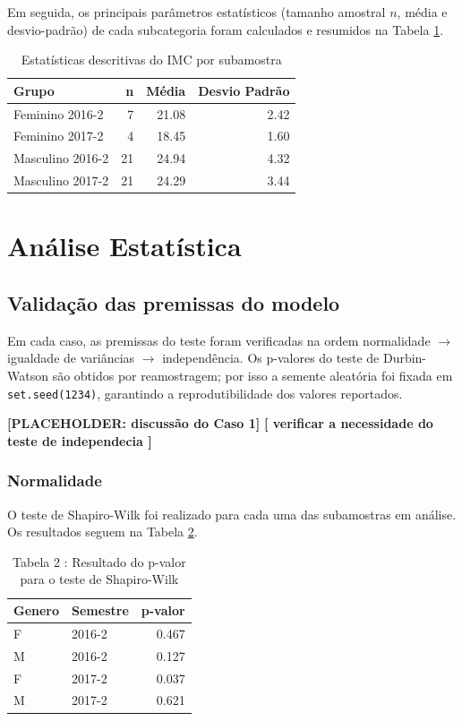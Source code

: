\documentclass[
]{article}
\begin{document}
Em seguida, os principais parâmetros estatísticos (tamanho amostral \(n\), média e desvio-padrão) de cada subcategoria foram calculados e resumidos na Tabela \ref{tab:tabela-resumo}.

\begin{table}[H]
\centering
\caption{\label{tab:tabela-resumo}Estatísticas descritivas do IMC por subamostra}
\centering
\begin{tabular}[t]{l|r|r|r}
\hline
Grupo & n & Média & Desvio Padrão\\
\hline
Feminino 2016-2 & 7 & 21.08 & 2.42\\
\hline
Feminino 2017-2 & 4 & 18.45 & 1.60\\
\hline
Masculino 2016-2 & 21 & 24.94 & 4.32\\
\hline
Masculino 2017-2 & 21 & 24.29 & 3.44\\
\hline
\end{tabular}
\end{table}

\section{Análise Estatística}\label{anuxe1lise-estatuxedstica}

\subsection{Validação das premissas do modelo}\label{validauxe7uxe3o-das-premissas-do-modelo}

Em cada caso, as premissas do teste foram verificadas na ordem
normalidade \(\rightarrow\) igualdade de variâncias \(\rightarrow\) independência. Os p-valores
do teste de Durbin-Watson são obtidos por reamostragem; por isso a semente aleatória foi
fixada em \texttt{set.seed(1234)}, garantindo a reprodutibilidade dos valores reportados.

\textbf{{[}PLACEHOLDER: discussão do Caso 1{]}}
\textbf{{[} verificar a necessidade do teste de independecia {]}}

\subsubsection{Normalidade}\label{normalidade}

O teste de Shapiro-Wilk foi realizado para cada uma das subamostras em análise. Os resultados seguem na Tabela \ref{tab:st-table}.

\begin{table}

\caption{\label{tab:st-table}Tabela 2 : Resultado do p-valor para o teste de Shapiro-Wilk }
\centering
\begin{tabular}[t]{l|l|r}
\hline
Genero & Semestre & p-valor\\
\hline
F & 2016-2 & 0.467\\
\hline
M & 2016-2 & 0.127\\
\hline
F & 2017-2 & 0.037\\
\hline
M & 2017-2 & 0.621\\
\hline
\end{tabular}
\end{table}
\end{document}
